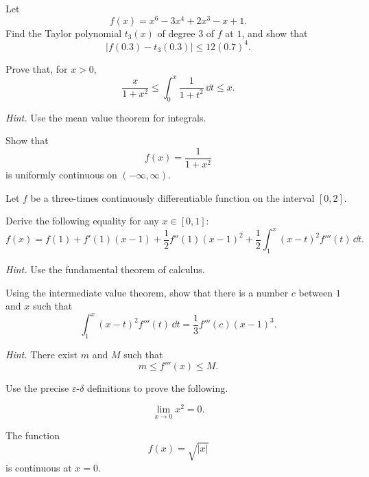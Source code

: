 \begin{problem}
Let
\[
f(x)=x^6-3x^4+2x^3-x+1.
\]
Find the Taylor polynomial $t_3(x)$ of degree $3$ of $f$ at $1$, and show that
\[
|f(0.3)-t_3(0.3)|\le 12(0.7)^4.
\]
\end{problem}

\begin{problem}
Prove that, for $x>0$,
\[
\frac{x}{1+x^2}
\le
\int_0^x\frac{1}{1+t^2}\,\dd t
\le x.
\]

\textit{Hint.} Use the mean value theorem for integrals.
\end{problem}

\begin{problem}
Show that
\[
f(x)=\frac{1}{1+x^2}
\]
is uniformly continuous on $(-\infty,\infty)$.
\end{problem}

\begin{problem}
Let $f$ be a three-times continuously differentiable function on the interval $[0,2]$.
\begin{problemsubparts}
\item Derive the following equality for any $x\in[0,1]$:
\[
f(x)
=
f(1)+f'(1)(x-1)
+\frac12 f''(1)(x-1)^2
+\frac12\int_1^x (x-t)^2f'''(t)\,\dd t.
\]

\textit{Hint.} Use the fundamental theorem of calculus.
\item Using the intermediate value theorem, show that there is a number $c$ between $1$ and $x$ such that
\[
\int_1^x (x-t)^2f'''(t)\,\dd t
=
\frac13 f'''(c)(x-1)^3.
\]

\textit{Hint.} There exist $m$ and $M$ such that
\[
m\le f'''(x)\le M.
\]
\end{problemsubparts}
\end{problem}


\begin{problem}
Use the precise $\varepsilon$-$\delta$ definitions to prove the following.
\begin{problemsubparts}
\item
\[
\lim_{x\to0}x^2=0.
\]
\item The function
\[
f(x)=\sqrt{|x|}
\]
is continuous at $x=0$.
\end{problemsubparts}
\end{problem}

